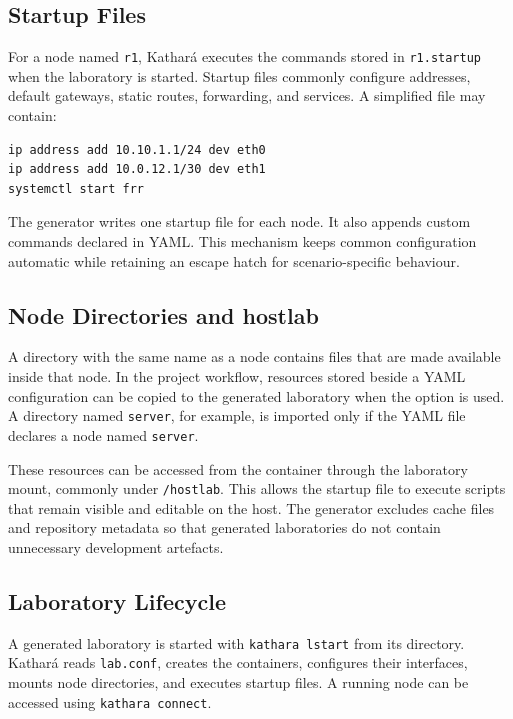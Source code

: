 \subsection{Startup Files}
\label{subsec:startup-files}

For a node named \texttt{r1}, Kathar\'a executes the commands stored in
\texttt{r1.startup} when the laboratory is started. Startup files commonly
configure addresses, default gateways, static routes, forwarding, and
services. A simplified file may contain:

\begin{lstlisting}[language=bash,caption={Simplified node startup file.},label={lst:startup-example}]
ip address add 10.10.1.1/24 dev eth0
ip address add 10.0.12.1/30 dev eth1
systemctl start frr
\end{lstlisting}

The generator writes one startup file for each node. It also appends custom
commands declared in YAML. This mechanism keeps common configuration
automatic while retaining an escape hatch for scenario-specific behaviour.

\subsection{Node Directories and hostlab}
\label{subsec:node-directories}

A directory with the same name as a node contains files that are made
available inside that node. In the project workflow, resources stored beside a
YAML configuration can be copied to the generated laboratory when the
 option is used. A directory named \texttt{server}, for
example, is imported only if the YAML file declares a node named
\texttt{server}.

These resources can be accessed from the container through the laboratory
mount, commonly under \texttt{/hostlab}. This allows the startup file to
execute scripts that remain visible and editable on the host. The generator
excludes cache files and repository metadata so that generated laboratories do
not contain unnecessary development artefacts.

\subsection{Laboratory Lifecycle}
\label{subsec:kathara-lifecycle}

A generated laboratory is started with \texttt{kathara lstart} from its
directory. Kathar\'a reads \texttt{lab.conf}, creates the containers,
configures their interfaces, mounts node directories, and executes startup
files. A running node can be accessed using \texttt{kathara connect}.

